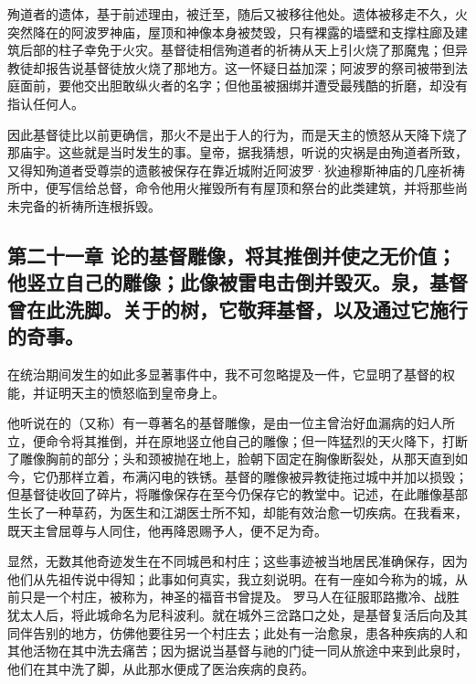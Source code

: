 殉道者的遗体，基于前述理由，被迁至，随后又被移往他处。遗体被移走不久，火突然降在的阿波罗神庙，屋顶和神像本身被焚毁，只有裸露的墙壁和支撑柱廊及建筑后部的柱子幸免于火灾。基督徒相信殉道者的祈祷从天上引火烧了那魔鬼；但异教徒却报告说基督徒放火烧了那地方。这一怀疑日益加深；阿波罗的祭司被带到法庭面前，要他交出胆敢纵火者的名字；但他虽被捆绑并遭受最残酷的折磨，却没有指认任何人。\par

因此基督徒比以前更确信，那火不是出于人的行为，而是天主的愤怒从天降下烧了那庙宇。这些就是当时发生的事。皇帝，据我猜想，听说的灾祸是由殉道者所致，又得知殉道者受尊崇的遗骸被保存在靠近城附近阿波罗·狄迪穆斯神庙的几座祈祷所中，便写信给总督，命令他用火摧毁所有有屋顶和祭台的此类建筑，并将那些尚未完备的祈祷所连根拆毁。\par


\subsection{第二十一章 论的基督雕像，将其推倒并使之无价值；他竖立自己的雕像；此像被雷电击倒并毁灭。泉，基督曾在此洗脚。关于的树，它敬拜基督，以及通过它施行的奇事。}

在统治期间发生的如此多显著事件中，我不可忽略提及一件，它显明了基督的权能，并证明天主的愤怒临到皇帝身上。\par

他听说在的（又称）有一尊著名的基督雕像，是由一位主曾治好血漏病的妇人所立，便命令将其推倒，并在原地竖立他自己的雕像；但一阵猛烈的天火降下，打断了雕像胸前的部分；头和颈被抛在地上，脸朝下固定在胸像断裂处，从那天直到如今，它仍那样立着，布满闪电的铁锈。基督的雕像被异教徒拖过城中并加以损毁；但基督徒收回了碎片，将雕像保存在至今仍保存它的教堂中。记述，在此雕像基部生长了一种草药，为医生和江湖医士所不知，却能有效治愈一切疾病。在我看来，既天主曾屈尊与人同住，他再降恩赐予人，便不足为奇。\par

显然，无数其他奇迹发生在不同城邑和村庄；这些事迹被当地居民准确保存，因为他们从先祖传说中得知；此事如何真实，我立刻说明。在有一座如今称为的城，从前只是一个村庄，被称为，神圣的福音书曾提及。 罗马人在征服耶路撒冷、战胜犹太人后，将此城命名为尼科波利。就在城外三岔路口之处，是基督复活后向及其同伴告别的地方，仿佛他要往另一个村庄去；此处有一治愈泉，患各种疾病的人和其他活物在其中洗去痛苦；因为据说当基督与祂的门徒一同从旅途中来到此泉时，他们在其中洗了脚，从此那水便成了医治疾病的良药。\par

